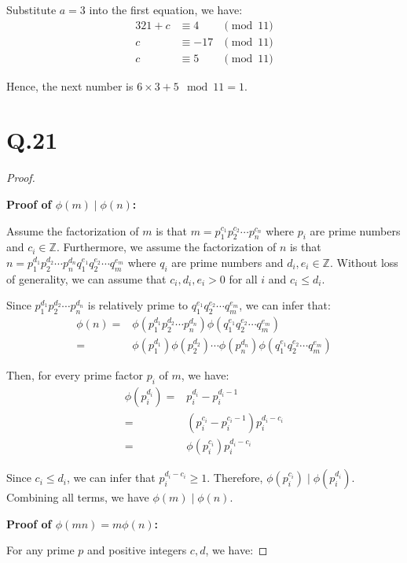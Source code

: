 \documentclass[a4paper,12pt]{article}
\begin{document}
Substitute $a = 3$ into the first equation, we have:
\begin{alignat*}{3}
	21 + c &\equiv 4 &\pmod{11} \\
	c &\equiv -17 &\pmod{11} \\
	c &\equiv 5 &\pmod{11}
\end{alignat*}

Hence, the next number is $6 \times 3 + 5 \mod 11 = 1$.

\section*{Q.21}

\begin{proof}
$ $

\textbf{Proof of $\phi(m) \mid \phi(n)$:}

Assume the factorization of $m$ is that $m = p_1^{c_1} p_2^{c_2} \cdots p_n^{c_n}$ where $p_i$ are prime numbers and $c_i \in \mathbb{Z}$.
Furthermore, we assume the factorization of $n$ is that $n = p_1^{d_1} p_2^{d_2} \cdots p_n^{d_n} q_1^{e_1} q_2^{e_2} \cdots q_m^{e_m}$ where $q_i$ are prime numbers and $d_i, e_i \in \mathbb{Z}$.
Without loss of generality, we can assume that $c_i, d_i, e_i > 0$ for all $i$ and $c_i \leq d_i$.

Since $p_1^{d_1} p_2^{d_2} \cdots p_n^{d_n}$ is relatively prime to $q_1^{e_1} q_2^{e_2} \cdots q_m^{e_m}$, we can infer that:
\begin{align*}
	\phi(n) =& \phi(p_1^{d_1} p_2^{d_2} \cdots p_n^{d_n}) \phi(q_1^{e_1} q_2^{e_2} \cdots q_m^{e_m})\\
	=& \phi(p_1^{d_1}) \phi(p_2^{d_2}) \cdots \phi(p_n^{d_n}) \phi(q_1^{e_1} q_2^{e_2} \cdots q_m^{e_m})
\end{align*}

Then, for every prime factor $p_i$ of $m$, we have:
\begin{align*}
	\phi(p_i^{d_i}) =& p_i^{d_i} - p_i^{d_i - 1} \\
	=& (p_i^{c_i} - p_i^{c_i - 1}) p_i^{d_i - c_i} \\
	=& \phi(p_i^{c_i}) p_i^{d_i - c_i}
\end{align*}

Since $c_i \leq d_i$, we can infer that $p_i^{d_i - c_i} \geq 1$.
Therefore, $\phi(p_i^{c_i}) \mid \phi(p_i^{d_i})$.
Combining all terms, we have $\phi(m) \mid \phi(n)$.

\newpage
\textbf{Proof of $\phi(mn) = m \phi(n)$:}

For any prime $p$ and positive integers $c,d$, we have:


\end{proof}
\end{document}
